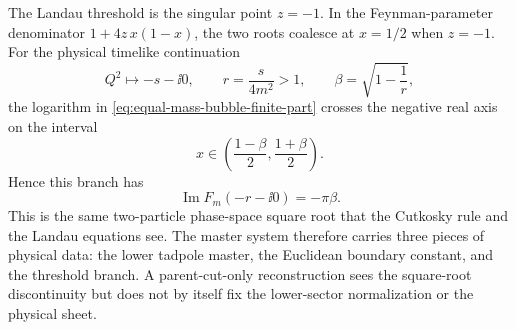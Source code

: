 \begin{controlledapproximation}
The Landau threshold is the singular point \(z=-1\).  In the Feynman-parameter
denominator \(1+4z\,x(1-x)\), the two roots coalesce at
\(x=1/2\) when \(z=-1\).  For the physical timelike continuation
\[
  Q^2\mapsto -s-\ii0,\qquad
  r=\frac{s}{4m^2}>1,\qquad
  \beta=\sqrt{1-\frac1r},
\]
the logarithm in
\eqref{eq:equal-mass-bubble-finite-part} crosses the negative real axis on
the interval
\[
  x\in\left(\frac{1-\beta}{2},\frac{1+\beta}{2}\right).
\]
Hence this branch has
\begin{equation}
  \operatorname{Im}F_m(-r-\ii0)=-\pi\beta .
  \label{eq:equal-mass-bubble-threshold-imaginary-part}
\end{equation}
This is the same two-particle phase-space square root that the Cutkosky rule
and the Landau equations see.  The master system therefore carries three
pieces of physical data: the lower tadpole master, the Euclidean boundary
constant, and the threshold branch.  A parent-cut-only reconstruction sees
the square-root discontinuity but does not by itself fix the lower-sector
normalization or the physical sheet.
\end{controlledapproximation}


